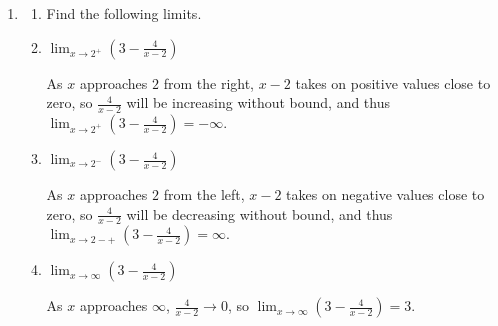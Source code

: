 \documentclass{article}
\newenvironment{enumeratecols}[2][]
{\NumTabs{#2}%
  \begin{enumerate*}[%
    itemjoin={\tab},#1]}%
  {\end{enumerate*}}
\begin{document}
\begin{enumerate}
\begin{enumerate}
  \end{enumerate}

\item 

  \begin{enumerate}
  \item Find the following limits.

    \probonly{\begin{enumeratecols}{3}}
    \item
      \begin{problem}
        $\displaystyle \lim_{x \to 2^+} \left( 3 - \frac{4}{x - 2} \right)$
      \end{problem}

      \begin{solution}
        As $x$ approaches $2$ from the right, $x-2$ takes on positive values close to zero,
        so $\frac{4}{x-2}$ will be increasing without bound, and thus 
        $\displaystyle \lim_{x \to 2^+} \left( 3 - \frac{4}{x - 2} \right) = -\infty$.
      \end{solution}

    \item
      \begin{problem}
        $\displaystyle \lim_{x \to 2^-} \left( 3 - \frac{4}{x - 2} \right)$
      \end{problem}

      \begin{solution}
        As $x$ approaches $2$ from the left, $x-2$ takes on negative values close to zero,
        so $\frac{4}{x-2}$ will be decreasing without bound, and thus 
        $\displaystyle \lim_{x \to 2-+} \left( 3 - \frac{4}{x - 2} \right) = \infty$.
      \end{solution}

    \item
      \begin{problem}
        $\displaystyle \lim_{x \to \infty} \left( 3 - \frac{4}{x - 2} \right)$
      \end{problem}

      \begin{solution}
        As $x$ approaches $\infty$, $\frac{4}{x-2} \to 0$, so 
        $\displaystyle \lim_{x \to \infty} \left( 3 - \frac{4}{x - 2} \right) =3$.
      \end{solution}

    \probonly{\end{enumeratecols}}

    \pspace{1.5in}


\end{enumerate}
\end{enumerate}
\end{document}
